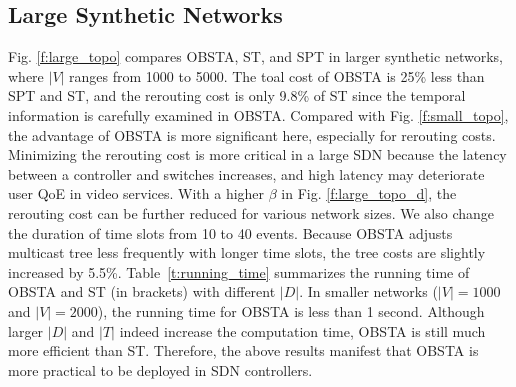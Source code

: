 \documentclass[10pt, conference, letterpaper]{IEEEtran}
\theoremstyle{definition}
\begin{document}
\subsection{Large Synthetic Networks}
Fig. \ref{f:large_topo} compares OBSTA, ST, and SPT in larger synthetic networks, where $|V|$ ranges from 1000 to 5000. The toal cost of OBSTA is 25\% less than SPT and ST, and the rerouting cost is only 9.8\% of ST since the temporal information is carefully examined in OBSTA. Compared with Fig. \ref{f:small_topo}, the advantage of OBSTA is more significant here, especially for rerouting costs. Minimizing the rerouting cost is more critical in a large SDN because the latency between a controller and switches increases, and high latency may deteriorate user QoE in video services. With a higher $\beta$ in Fig. \ref{f:large_topo_d}, the rerouting cost can be further reduced for various network sizes. {\color{black} We also change the duration of time slots from 10 to 40 events. Because OBSTA adjusts multicast tree less frequently with longer time slots, the tree costs are slightly increased by 5.5\%.} Table~\ref{t:running_time} summarizes the running time of OBSTA and ST (in brackets) with different $|D|$. In smaller networks ($|V| = 1000$ and $|V| = 2000$), the running time for OBSTA is less than 1 second. Although larger $|D|$ and $|T|$ indeed increase the computation time, OBSTA is still much more efficient than ST. Therefore, the above results manifest that OBSTA is more practical to be deployed in SDN controllers.

\end{document}
